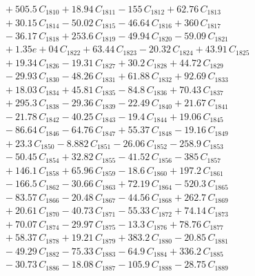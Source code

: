 \documentclass[a4paper,11pt]{article}
\begin{document}
\begin{align}
&\quad + 505.5\,C_{1810} + 18.94\,C_{1811} - 155\,C_{1812} + 62.76\,C_{1813} \nonumber\\
&\quad + 30.15\,C_{1814} - 50.02\,C_{1815} - 46.64\,C_{1816} + 360\,C_{1817} \nonumber\\
&\quad - 36.17\,C_{1818} + 253.6\,C_{1819} - 49.94\,C_{1820} - 59.09\,C_{1821} \nonumber\\
&\quad + 1.35e+04\,C_{1822} + 63.44\,C_{1823} - 20.32\,C_{1824} + 43.91\,C_{1825} \nonumber\\
&\quad + 19.34\,C_{1826} - 19.31\,C_{1827} + 30.2\,C_{1828} + 44.72\,C_{1829} \nonumber\\
&\quad - 29.93\,C_{1830} - 48.26\,C_{1831} + 61.88\,C_{1832} + 92.69\,C_{1833} \nonumber\\
&\quad + 18.03\,C_{1834} + 45.81\,C_{1835} - 84.8\,C_{1836} + 70.43\,C_{1837} \nonumber\\
&\quad + 295.3\,C_{1838} - 29.36\,C_{1839} - 22.49\,C_{1840} + 21.67\,C_{1841} \nonumber\\
&\quad - 21.78\,C_{1842} - 40.25\,C_{1843} - 19.4\,C_{1844} + 19.06\,C_{1845} \nonumber\\
&\quad - 86.64\,C_{1846} - 64.76\,C_{1847} + 55.37\,C_{1848} - 19.16\,C_{1849} \nonumber\\
&\quad + 23.3\,C_{1850} - 8.882\,C_{1851} - 26.06\,C_{1852} - 258.9\,C_{1853} \nonumber\\
&\quad - 50.45\,C_{1854} + 32.82\,C_{1855} - 41.52\,C_{1856} - 385\,C_{1857} \nonumber\\
&\quad + 146.1\,C_{1858} + 65.96\,C_{1859} - 18.6\,C_{1860} + 197.2\,C_{1861} \nonumber\\
&\quad - 166.5\,C_{1862} - 30.66\,C_{1863} + 72.19\,C_{1864} - 520.3\,C_{1865} \nonumber\\
&\quad - 83.57\,C_{1866} - 20.48\,C_{1867} - 44.56\,C_{1868} + 262.7\,C_{1869} \nonumber\\
&\quad + 20.61\,C_{1870} - 40.73\,C_{1871} - 55.33\,C_{1872} + 74.14\,C_{1873} \nonumber\\
&\quad + 70.07\,C_{1874} - 29.97\,C_{1875} - 13.3\,C_{1876} + 78.76\,C_{1877} \nonumber\\
&\quad + 58.37\,C_{1878} + 19.21\,C_{1879} + 383.2\,C_{1880} - 20.85\,C_{1881} \nonumber\\
&\quad - 49.29\,C_{1882} - 75.33\,C_{1883} - 64.9\,C_{1884} + 336.2\,C_{1885} \nonumber\\
&\quad - 30.73\,C_{1886} - 18.08\,C_{1887} - 105.9\,C_{1888} - 28.75\,C_{1889} \nonumber\\

\end{align}
\end{document}
